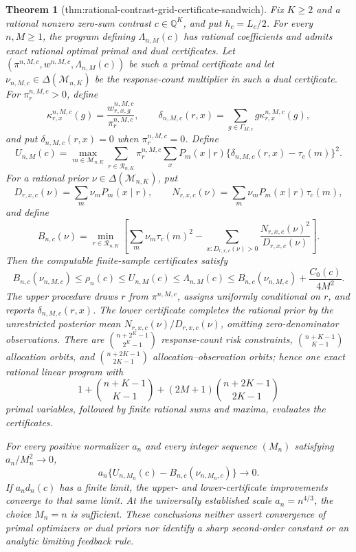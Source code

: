 \documentclass{article}
\newtheorem{theorem}{Theorem}
\begin{document}
\begin{theorem}[thm:rational-contrast-grid-certificate-sandwich]\label{thm:rational-contrast-grid-certificate-sandwich}
Fix \(K\geq2\) and a rational nonzero zero-sum contrast \(c\in\mathbb Q^K\), and put \(h_c=L_c/2\).  For every \(n,M\geq1\), the program defining \(\Lambda_{n,M}(c)\) has rational coefficients and admits exact rational optimal primal and dual certificates.  Let \((\pi^{n,M,c},w^{n,M,c},\Lambda_{n,M}(c))\) be such a primal certificate and let \(\nu_{n,M,c}\in\Delta(\mathcal M_{n,K})\) be the response-count multiplier in such a dual certificate.  For \(\pi_r^{n,M,c}>0\), define
\[
 \kappa_{r,x}^{n,M,c}(g)=\frac{w_{r,x,g}^{n,M,c}}{\pi_r^{n,M,c}},
 \qquad
 \delta_{n,M,c}(r,x)=\sum_{g\in\Gamma_{M,c}}g\kappa_{r,x}^{n,M,c}(g),
\]
and put \(\delta_{n,M,c}(r,x)=0\) when \(\pi_r^{n,M,c}=0\).  Define
\[
 U_{n,M}(c)=\max_{m\in\mathcal M_{n,K}}
 \sum_{r\in\mathcal R_{n,K}}\pi_r^{n,M,c}\sum_xP_m(x\mid r)
 \{\delta_{n,M,c}(r,x)-\tau_c(m)\}^2.
\]
For a rational prior \(\nu\in\Delta(\mathcal M_{n,K})\), put
\[
 D_{r,x,c}(\nu)=\sum_m\nu_mP_m(x\mid r),
 \qquad
 N_{r,x,c}(\nu)=\sum_m\nu_mP_m(x\mid r)\tau_c(m),
\]
and define
\[
 B_{n,c}(\nu)=\min_{r\in\mathcal R_{n,K}}
 \left[
 \sum_m\nu_m\tau_c(m)^2-
 \sum_{x:D_{r,x,c}(\nu)>0}
 \frac{N_{r,x,c}(\nu)^2}{D_{r,x,c}(\nu)}
 \right].
\]
Then the computable finite-sample certificates satisfy
\[
 B_{n,c}(\nu_{n,M,c})\leq\rho_n(c)\leq U_{n,M}(c)
 \leq\Lambda_{n,M}(c)
 \leq B_{n,c}(\nu_{n,M,c})+\frac{C_0(c)}{4M^2}.
\]
The upper procedure draws \(r\) from \(\pi^{n,M,c}\), assigns uniformly conditional on \(r\), and reports \(\delta_{n,M,c}(r,x)\).  The lower certificate completes the rational prior by the unrestricted posterior mean \(N_{r,x,c}(\nu)/D_{r,x,c}(\nu)\), omitting zero-denominator observations.  There are \(\binom{n+2^K-1}{2^K-1}\) response-count risk constraints, \(\binom{n+K-1}{K-1}\) allocation orbits, and \(\binom{n+2K-1}{2K-1}\) allocation--observation orbits; hence one exact rational linear program with
\[
 1+\binom{n+K-1}{K-1}
 +(2M+1)\binom{n+2K-1}{2K-1}
\]
primal variables, followed by finite rational sums and maxima, evaluates the certificates.

For every positive normalizer \(a_n\) and every integer sequence \((M_n)\) satisfying \(a_n/M_n^2\to0\),
\[
 a_n\{U_{n,M_n}(c)-B_{n,c}(\nu_{n,M_n,c})\}\longrightarrow0.
\]
If \(a_nd_n(c)\) has a finite limit, the upper- and lower-certificate improvements converge to that same limit.  At the universally established scale \(a_n=n^{4/3}\), the choice \(M_n=n\) is sufficient.  These conclusions neither assert convergence of primal optimizers or dual priors nor identify a sharp second-order constant or an analytic limiting feedback rule.
\end{theorem}
\end{document}
